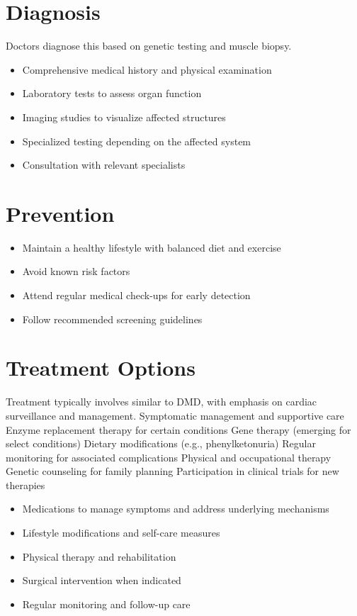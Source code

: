 \section{Diagnosis}
Doctors diagnose this based on genetic testing and muscle biopsy.

\begin{itemize}[noitemsep]
  \item Comprehensive medical history and physical examination
  \item Laboratory tests to assess organ function
  \item Imaging studies to visualize affected structures
  \item Specialized testing depending on the affected system
  \item Consultation with relevant specialists
\end{itemize}
\section{Prevention}
\begin{itemize}[noitemsep]
  \item Maintain a healthy lifestyle with balanced diet and exercise
  \item Avoid known risk factors
  \item Attend regular medical check-ups for early detection
  \item Follow recommended screening guidelines
\end{itemize}
\section{Treatment Options}
Treatment typically involves similar to DMD, with emphasis on cardiac surveillance and management. Symptomatic management and supportive care Enzyme replacement therapy for certain conditions Gene therapy (emerging for select conditions) Dietary modifications (e.g., phenylketonuria) Regular monitoring for associated complications Physical and occupational therapy Genetic counseling for family planning Participation in clinical trials for new therapies

\begin{itemize}[noitemsep]
  \item Medications to manage symptoms and address underlying mechanisms
  \item Lifestyle modifications and self-care measures
  \item Physical therapy and rehabilitation
  \item Surgical intervention when indicated
  \item Regular monitoring and follow-up care
\end{itemize}

